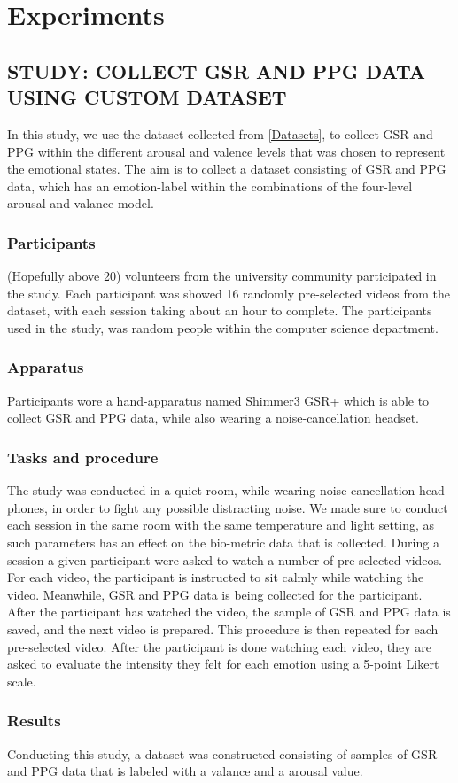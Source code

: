 \chapter{Experiments}

\section{STUDY: COLLECT GSR AND PPG DATA USING CUSTOM DATASET}
In this study, we use the dataset collected from \cref{Datasets}, to collect GSR and PPG within the different arousal and valence levels that was chosen to represent the emotional states. The aim is to collect a dataset consisting of GSR and PPG data, which has an emotion-label within the combinations of the four-level arousal and valance model. 

\subsection{Participants}
(Hopefully above 20) volunteers from the university community participated in the study. Each participant was showed 16 randomly pre-selected videos from the dataset, with each session taking about an hour to complete. The participants used in the study, was random people within the computer science department.

\subsection{Apparatus}
Participants wore a hand-apparatus named Shimmer3 GSR+ which is able to collect GSR and PPG data, while also wearing a noise-cancellation headset.  

\subsection{Tasks and procedure}
The study was conducted in a quiet room, while wearing noise-cancellation head-phones, in order to fight any possible distracting noise. We made sure to conduct each session in the same room with the same temperature and light setting, as such parameters has an effect on the bio-metric data that is collected.
During a session a given participant were asked to watch a number of pre-selected  videos. For each video, the participant is instructed to sit calmly while watching the video. Meanwhile, GSR and PPG data is being collected for the participant. After the participant has watched the video, the sample of GSR and PPG data is saved, and the next video is prepared. This procedure is then repeated for each pre-selected video. 
After the participant is done watching each video, they are asked to evaluate the intensity they felt for each emotion using a 5-point Likert scale.

\subsection{Results}
Conducting this study, a dataset was constructed consisting of samples of GSR and PPG data that is labeled with a valance and a arousal value.